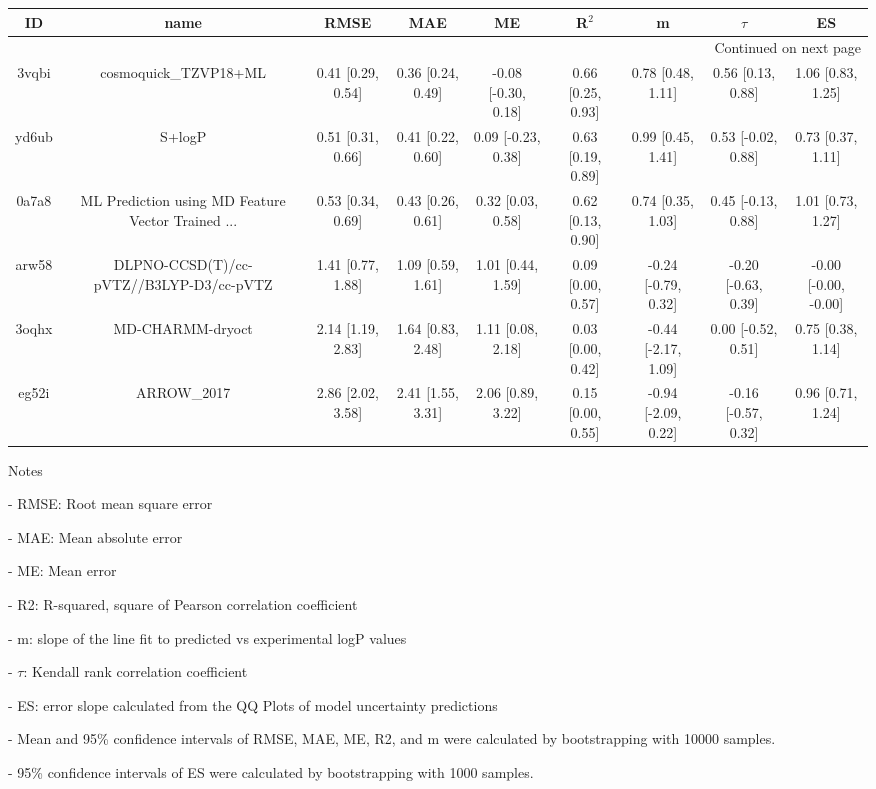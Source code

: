 \documentclass{article}
\begin{document}
\begin{center}
\scriptsize
\begin{longtable}{|ccccccccc|}
\toprule
    ID &                                               name &               RMSE &                MAE &                   ME &              R$^2$ &                    m &               $\tau$ &                    ES \\
\midrule
\endhead
\midrule
\multicolumn{9}{r}{{Continued on next page}} \\
\midrule
\endfoot

\bottomrule
\endlastfoot
 3vqbi &                              cosmoquick\_TZVP18+ML &  0.41 [0.29, 0.54] &  0.36 [0.24, 0.49] &  -0.08 [-0.30, 0.18] &  0.66 [0.25, 0.93] &    0.78 [0.48, 1.11] &    0.56 [0.13, 0.88] &     1.06 [0.83, 1.25] \\
 yd6ub &                                             S+logP &  0.51 [0.31, 0.66] &  0.41 [0.22, 0.60] &   0.09 [-0.23, 0.38] &  0.63 [0.19, 0.89] &    0.99 [0.45, 1.41] &   0.53 [-0.02, 0.88] &     0.73 [0.37, 1.11] \\
 0a7a8 &  ML Prediction using MD Feature Vector Trained ... &  0.53 [0.34, 0.69] &  0.43 [0.26, 0.61] &    0.32 [0.03, 0.58] &  0.62 [0.13, 0.90] &    0.74 [0.35, 1.03] &   0.45 [-0.13, 0.88] &     1.01 [0.73, 1.27] \\
 arw58 &            DLPNO-CCSD(T)/cc-pVTZ//B3LYP-D3/cc-pVTZ &  1.41 [0.77, 1.88] &  1.09 [0.59, 1.61] &    1.01 [0.44, 1.59] &  0.09 [0.00, 0.57] &  -0.24 [-0.79, 0.32] &  -0.20 [-0.63, 0.39] &  -0.00 [-0.00, -0.00] \\
 3oqhx &                                   MD-CHARMM-dryoct &  2.14 [1.19, 2.83] &  1.64 [0.83, 2.48] &    1.11 [0.08, 2.18] &  0.03 [0.00, 0.42] &  -0.44 [-2.17, 1.09] &   0.00 [-0.52, 0.51] &     0.75 [0.38, 1.14] \\
 eg52i &                                        ARROW\_2017 &  2.86 [2.02, 3.58] &  2.41 [1.55, 3.31] &    2.06 [0.89, 3.22] &  0.15 [0.00, 0.55] &  -0.94 [-2.09, 0.22] &  -0.16 [-0.57, 0.32] &     0.96 [0.71, 1.24] \\
\end{longtable}
\end{center}

Notes

- RMSE: Root mean square error

- MAE: Mean absolute error

- ME: Mean error

- R2: R-squared, square of Pearson correlation coefficient

- m: slope of the line fit to predicted vs experimental logP values

- $\tau$:  Kendall rank correlation coefficient

- ES: error slope calculated from the QQ Plots of model uncertainty predictions

- Mean and 95\% confidence intervals of RMSE, MAE, ME, R2, and m were calculated by bootstrapping with 10000 samples.

- 95\% confidence intervals of ES were calculated by bootstrapping with 1000 samples.\end{document}
\end{document}
